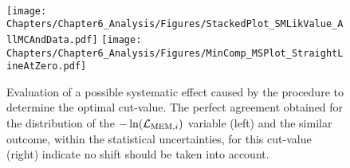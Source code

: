 \\
\begin{figure}[h!t]
 \centering
 \texttt{[image: Chapters/Chapter6\_Analysis/Figures/StackedPlot\_SMLikValue\_AllMCAndData.pdf]} \hspace{0.3cm}
 \texttt{[image: Chapters/Chapter6\_Analysis/Figures/MinComp\_MSPlot\_StraightLineAtZero.pdf]}   %
 \caption{Evaluation of a possible systematic effect caused by the procedure to determine the optimal cut-value. The perfect agreement obtained for the distribution of the $-\ln(\mathcal{L}_{\textrm{MEM}, i})$ variable (left) and the similar outcome, within the statistical uncertainties, for this cut-value (right) indicate no shift should be taken into account.} 
 \label{fig::CutValue}
\end{figure}




